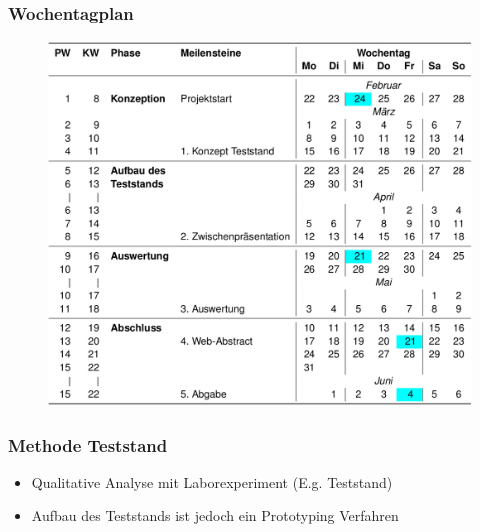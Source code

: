 \documentclass{beamer}
\begin{document}
    \begin{frame}
        \frametitle{Wochentagplan}

        \begin{figure}[t]
            \includegraphics[height=0.8\textheight]{img/wochentagplan.png}
        \end{figure}

    \end{frame} %


    \begin{frame}
        \frametitle{Methode Teststand}

        \begin{itemize}
            \item Qualitative Analyse mit Laborexperiment (E.g. Teststand)
            \item Aufbau des Teststands ist jedoch ein Prototyping Verfahren
        \end{itemize}
    \end{frame} %
\end{document}
